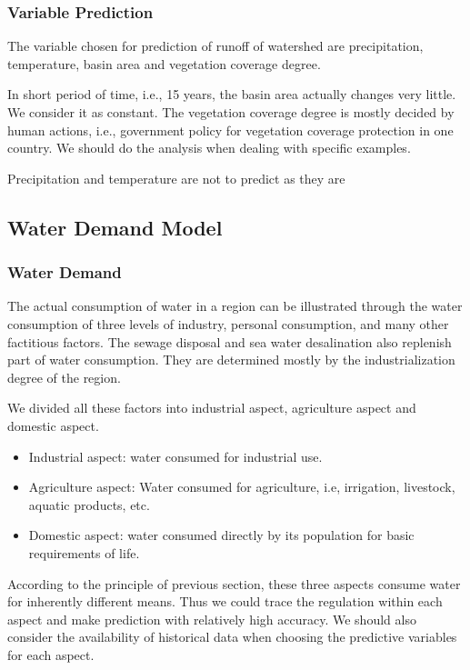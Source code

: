 \documentclass{mcmthesis}
\begin{document}
\subsubsection{Variable Prediction}
The variable chosen for prediction of runoff of watershed are precipitation, temperature, basin area and vegetation coverage degree. 

In short period of time, i.e., 15 years, the basin area actually changes very little. We consider it as constant. The vegetation coverage degree is mostly decided by human actions, i.e., government policy for vegetation coverage protection in one country. We should do the analysis when dealing with specific examples. 

Precipitation and temperature are not to predict as they are  
\subsection{Water Demand Model}
\subsubsection{Water Demand}
The actual consumption of water in a region can be illustrated through the water consumption of three levels of industry, personal consumption, and many other factitious factors. The sewage disposal and sea water desalination also replenish part of water consumption. They are determined mostly by the industrialization degree of the region.

We divided all these factors into industrial aspect, agriculture aspect and domestic aspect.
\begin{itemize}
\item Industrial aspect: water consumed for industrial use. 
\item Agriculture aspect: Water consumed for agriculture, i.e, irrigation, livestock, aquatic  products, etc. 
\item Domestic aspect: water consumed directly by its population for basic requirements of life. 

\end{itemize}

According to the principle of previous section, these three aspects consume water for inherently different means. Thus we could trace the regulation within each aspect and make prediction with relatively high accuracy. We should also consider the availability of historical data when choosing the predictive variables for each aspect.
\end{document}
